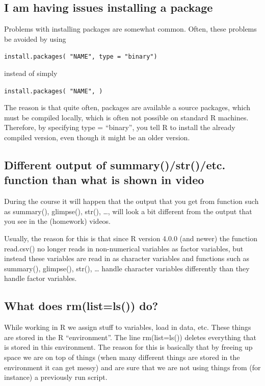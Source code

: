 \documentclass[
  letterpaper,
  8pt,
  a4paper]{book}
\begin{document}
\subsection*{I am having issues installing a
package}\label{i-am-having-issues-installing-a-package}

Problems with installing packages are somewhat common. Often, these
problems be avoided by using

\texttt{install.packages(\ "NAME",\ type\ =\ "binary")}

instead of simply

\texttt{install.packages(\ "NAME",\ )}

The reason is that quite often, packages are available a source
packages, which must be compiled locally, which is often not possible on
standard R machines. Therefore, by specifying type = ``binary'', you
tell R to install the already compiled version, even though it might be
an older version.

\subsection*{Different output of summary()/str()/etc. function than what
is shown in
video}\label{different-output-of-summarystretc.-function-than-what-is-shown-in-video}

During the course it will happen that the output that you get from
function such as summary(), glimpse(), str(), \ldots, will look a bit
different from the output that you see in the (homework) videos.

Usually, the reason for this is that since R version 4.0.0 (and newer)
the function read.csv() no longer reads in non-numerical variables as
factor variables, but instead these variables are read in as character
variables and functions such as summary(), glimpse(), str(), \ldots{}
handle character variables differently than they handle factor
variables.

\subsection*{What does rm(list=ls()) do?}\label{what-does-rmlistls-do}

While working in R we assign stuff to variables, load in data, etc.
These things are stored in the R ``environment''. The line rm(list=ls())
deletes everything that is stored in this environment. The reason for
this is basically that by freeing up space we are on top of things (when
many different things are stored in the environment it can get messy)
and are sure that we are not using things from (for instance) a
previously run script.
\end{document}
